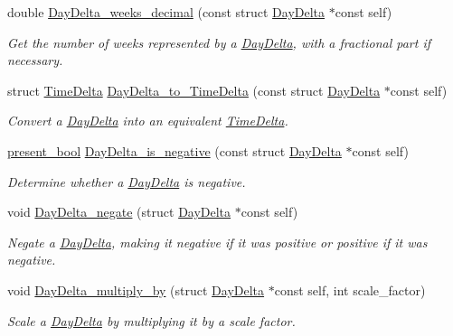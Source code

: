\begin{DoxyCompactItemize}
double \hyperlink{day-delta_8h_af6698416f241e2d9a6f54459fd0282ef}{Day\-Delta\-\_\-weeks\-\_\-decimal} (const struct \hyperlink{structDayDelta}{Day\-Delta} $\ast$const self)
\begin{DoxyCompactList}\small\item\em Get the number of weeks represented by a \hyperlink{structDayDelta}{Day\-Delta}, with a fractional part if necessary. \end{DoxyCompactList}\item 
struct \hyperlink{structTimeDelta}{Time\-Delta} \hyperlink{day-delta_8h_afaef350c558f8db4d84585c9bf64d871}{Day\-Delta\-\_\-to\-\_\-\-Time\-Delta} (const struct \hyperlink{structDayDelta}{Day\-Delta} $\ast$const self)
\begin{DoxyCompactList}\small\item\em Convert a \hyperlink{structDayDelta}{Day\-Delta} into an equivalent \hyperlink{structTimeDelta}{Time\-Delta}. \end{DoxyCompactList}\item 
\hyperlink{types_8h_a1c24e2cdd988b886e889080ded176ae0}{present\-\_\-bool} \hyperlink{day-delta_8h_ab4347a4d40f2e9577ce86f3fb5fb004d}{Day\-Delta\-\_\-is\-\_\-negative} (const struct \hyperlink{structDayDelta}{Day\-Delta} $\ast$const self)
\begin{DoxyCompactList}\small\item\em Determine whether a \hyperlink{structDayDelta}{Day\-Delta} is negative. \end{DoxyCompactList}\item 
void \hyperlink{day-delta_8h_a9deb74bc8d748a21449a16e658f16432}{Day\-Delta\-\_\-negate} (struct \hyperlink{structDayDelta}{Day\-Delta} $\ast$const self)
\begin{DoxyCompactList}\small\item\em Negate a \hyperlink{structDayDelta}{Day\-Delta}, making it negative if it was positive or positive if it was negative. \end{DoxyCompactList}\item 
void \hyperlink{day-delta_8h_af8c4a730c36c38da48ba2d6df982c167}{Day\-Delta\-\_\-multiply\-\_\-by} (struct \hyperlink{structDayDelta}{Day\-Delta} $\ast$const self, int scale\-\_\-factor)
\begin{DoxyCompactList}\small\item\em Scale a \hyperlink{structDayDelta}{Day\-Delta} by multiplying it by a scale factor. \end{DoxyCompactList}\item 

\end{DoxyCompactItemize}
